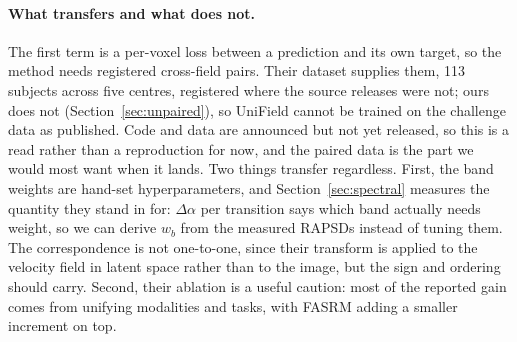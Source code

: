 \documentclass[11pt,a4paper]{article}
\begin{document}
\paragraph{What transfers and what does not.} The first term is a per-voxel loss between a prediction
and its own target, so the method needs registered cross-field pairs. Their dataset supplies them, 113
subjects across five centres, registered where the source releases were not; ours does not
(Section~\ref{sec:unpaired}), so UniField cannot be trained on the challenge data as published. Code and
data are announced but not yet released, so this is a read rather than a reproduction for now, and the
paired data is the part we would most want when it lands. Two things transfer regardless. First, the
band weights are hand-set hyperparameters, and Section~\ref{sec:spectral} measures the quantity they
stand in for: $\Delta\alpha$ per transition says which band actually needs weight, so we can derive
$w_b$ from the measured RAPSDs instead of tuning them. The correspondence is not one-to-one, since their
transform is applied to the velocity field in latent space rather than to the image, but the sign and
ordering should carry. Second, their ablation is a useful caution: most of the reported gain comes from
unifying modalities and tasks, with FASRM adding a smaller increment on top.
\end{document}
